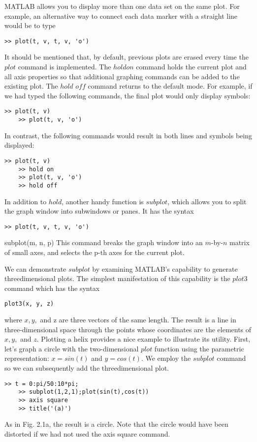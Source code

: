 \documentclass[../main.tex]{subfiles}
\begin{document}
MATLAB allows you to display more than one data set on the same plot. For example,
an alternative way to connect each data marker with a straight line would be to type
\begin{lstlisting}[frame=none, numbers=none]
	>> plot(t, v, t, v, 'o')
\end{lstlisting}

It should be mentioned that, by default, previous plots are erased every time the $plot$
command is implemented. The $hold on$ command holds the current plot and all axis properties 
so that additional graphing commands can be added to the existing plot. The $hold$
$off$ command returns to the default mode. For example, if we had typed the following
commands, the final plot would only display symbols:
\begin{lstlisting}[frame=none, numbers=none]
	>> plot(t, v)
	>> plot(t, v, 'o')
\end{lstlisting}


In contrast, the following commands would result in both lines and symbols being displayed:
\begin{lstlisting}[frame=none, numbers=none]
	>> plot(t, v)
	>> hold on
	>> plot(t, v, 'o')
	>> hold off
\end{lstlisting}
In addition to $hold$, another handy function is $subplot$, which allows you to split the
graph window into subwindows or panes. It has the syntax
\begin{lstlisting}[frame=none, numbers=none]
	>> plot(t, v, t, v, 'o')
\end{lstlisting}subplot(m, n, p)
This command breaks the graph window into an $m$-by-$n$ matrix of small axes, and selects
the p-th axes for the current plot.


We can demonstrate $subplot$ by examining MATLAB's capability to generate threedimensional plots. The simplest
 manifestation of this capability is the $plot3$ command
which has the syntax
\begin{lstlisting}[frame=none, numbers=none]
	plot3(x, y, z)
\end{lstlisting}
where $x, y,$ and z are three vectors of the same length. The result is a line in three-dimensional
space through the points whose coordinates are the elements of $x, y,$ and $z.$
Plotting a helix provides a nice example to illustrate its utility. First, let's graph a circle
with the two-dimensional $plot$ function using the parametric representation: $x = sin(t)$
and $y = cos(t)$. We employ the $subplot$ command so we can subsequently add the threedimensional plot.
\begin{lstlisting}[frame=none, numbers=none]
	>> t = 0:pi/50:10*pi;
	>> subplot(1,2,1);plot(sin(t),cos(t))
	>> axis square
	>> title('(a)')
\end{lstlisting}
As in Fig. 2.1a, the result is a circle. Note that the circle would have been distorted if we
had not used the axis square command.
\end{document}

